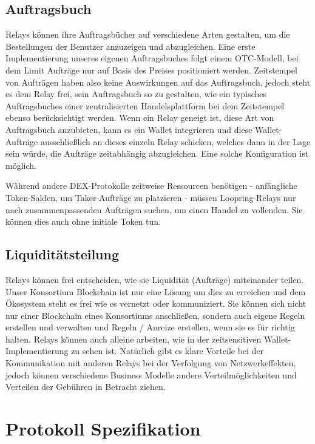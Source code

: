 \documentclass[UTF8,nofonts]{article}
\begin{document}
\begin{multicols}{2}
\subsection{Auftragsbuch\label{sec:order_book}}
Relays können ihre Auftragsbücher auf verschiedene Arten gestalten, um die Bestellungen der Benutzer anzuzeigen und abzugleichen. Eine erste Implementierung unseres eigenen Auftragsbuches folgt einem OTC-Modell, bei dem Limit Aufträge nur auf Basis des Preises positioniert werden. Zeitstempel von Aufträgen haben also keine Auswirkungen auf das Auftragsbuch, jedoch steht es dem Relay frei, sein Auftragsbuch so zu gestalten, wie ein typisches Auftragsbuches einer zentralisierten Handelsplattform bei dem Zeitstempel ebenso berücksichtigt werden. Wenn ein Relay geneigt ist, diese Art von Auftragsbuch anzubieten, kann es ein Wallet integrieren und diese Wallet-Aufträge ausschließlich an dieses einzeln Relay schicken, welches dann in der Lage sein würde, die Aufträge zeitabhängig abzugleichen. Eine solche Konfiguration ist möglich. 

Während andere DEX-Protokolle zeitweise Ressourcen benötigen - anfängliche Token-Salden, um Taker-Aufträge zu platzieren - müssen Loopring-Relays nur nach zusammenpassenden Aufträgen suchen, um einen Handel zu vollenden. Sie können dies auch ohne initiale Token tun.

\subsection{Liquiditätsteilung\label{sec:liquidity_sharing}}
Relays können frei entscheiden, wie sie Liquidität (Aufträge) miteinander teilen. Unser Konsortium Blockchain ist nur eine Lösung um dies zu erreichen und dem Ökosystem steht es frei wie es vernetzt oder kommuniziert. Sie können sich nicht nur einer Blockchain eines Konsortiums anschließen, sondern auch eigene Regeln erstellen und verwalten und Regeln / Anreize erstellen, wenn sie es für richtig halten. Relays können auch alleine arbeiten, wie in der zeitsensitiven Wallet-Implementierung zu sehen ist. Natürlich gibt es klare Vorteile bei der Kommunikation mit anderen Relays bei der Verfolgung von Netzwerkeffekten, jedoch können verschiedene Business Modelle andere Verteilmöglichkeiten und Verteilen der Gebühren in Betracht ziehen.

\section{Protokoll Spezifikation\label{sec:protocol}}


\end{multicols}
\end{document}
